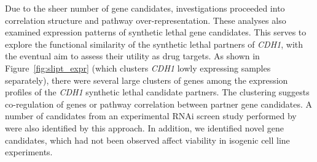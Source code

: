 Due to the sheer number of gene candidates, investigations proceeded into correlation structure and pathway over-represent\-ation. These analyses also examined expression patterns of synthetic lethal gene candidates. This serves to explore the functional similarity of the synthetic lethal partners of \textit{CDH1}, with the eventual aim to assess their utility as drug targets. As shown in Figure~\ref{fig:slipt_expr} (which clusters \textit{CDH1} lowly expressing samples separately), there were several large clusters of genes among the  expression profiles of the \textit{CDH1} synthetic lethal candidate partners. The clustering suggests co-regulation of genes or pathway correlation between partner gene candidates. A number of candidates from an experimental RNAi screen study performed by \citet{Telford2015} were also identified by this approach. In addition, we identified novel gene candidates, which had not been observed affect viability in isogenic cell line experiments. %

